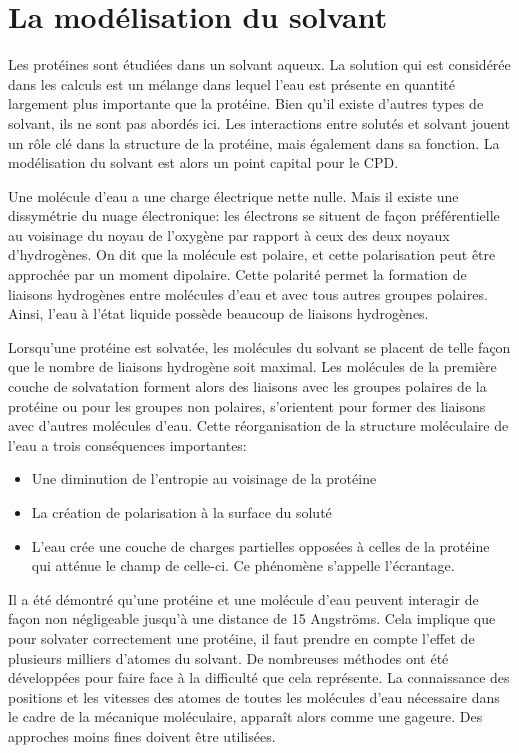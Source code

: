 \section{La modélisation du solvant}
Les protéines sont étudiées dans un solvant aqueux. La solution qui est considérée dans les calculs est un mélange dans lequel l'eau est présente en quantité largement plus importante que la protéine. Bien qu'il existe d'autres types de solvant, ils ne sont pas abordés ici. Les interactions entre solutés et solvant jouent un rôle clé dans la structure de la protéine, mais également dans sa fonction. La modélisation du solvant est alors un point capital pour le CPD.

Une molécule d'eau a une charge électrique nette nulle. Mais il existe une dissymétrie du nuage électronique: les électrons se situent de façon préférentielle au voisinage du noyau de l'oxygène par rapport à ceux des deux noyaux d'hydrogènes. On dit que la molécule est polaire, et cette polarisation peut être approchée par un moment dipolaire. Cette polarité permet la formation de liaisons hydrogènes entre molécules d'eau et avec tous autres groupes polaires. Ainsi, l'eau à l'état liquide possède beaucoup de liaisons hydrogènes.

Lorsqu'une protéine est solvatée, les molécules du solvant se placent de telle façon que le nombre de liaisons hydrogène soit maximal. Les molécules de la première couche de solvatation forment alors des liaisons avec les groupes polaires de la protéine ou pour les groupes non polaires, s'orientent pour former des liaisons avec d'autres molécules d'eau. Cette réorganisation de la structure moléculaire de l'eau a trois conséquences importantes:

\begin{itemize}
\item Une diminution de l'entropie au voisinage de la protéine  
\item La création de polarisation à la surface du soluté
\item  L'eau crée une couche de charges partielles opposées à celles de la protéine qui atténue le champ de celle-ci. Ce phénomène s'appelle l'écrantage.
\end{itemize}
  
Il a été démontré qu'une protéine et une molécule d'eau peuvent interagir de façon non négligeable jusqu'à une distance de 15 Angströms. Cela implique que pour solvater correctement une protéine, il faut prendre en compte l'effet de plusieurs milliers d'atomes du solvant.
De nombreuses méthodes ont été développées pour faire face à la difficulté que cela représente.
La connaissance des positions et les vitesses des atomes de toutes les molécules d'eau nécessaire dans le cadre de la mécanique moléculaire, apparaît alors comme une gageure. Des approches moins fines doivent être utilisées. 

